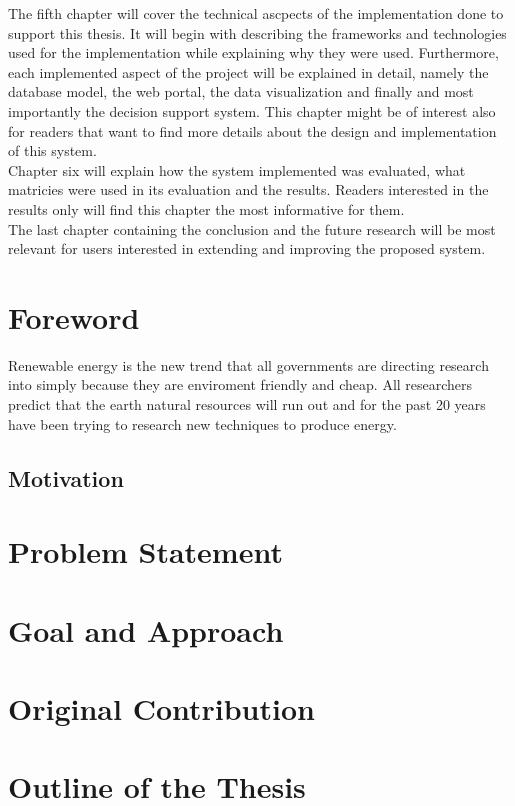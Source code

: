 \indent The fifth chapter will cover the technical ascpects of the implementation done to support this thesis. It will begin with describing the frameworks and technologies used for the implementation while explaining why they were used. Furthermore, each implemented aspect of the project will be explained in detail, namely the database model, the web portal, the data visualization and finally and most importantly the decision support system. This chapter might be of interest also for readers that want to find more details about the design and implementation of this system.\\
\indent Chapter six will explain how the system implemented was evaluated, what matricies were used in its evaluation and the results. Readers interested in the results only will find this chapter the most informative for them.\\
\indent The last chapter containing the conclusion and the future research will be most relevant for users interested in extending and improving the proposed system.\\
\section{Foreword}
\label{sec:Foreword}
\indent Renewable energy is the new trend that all governments are directing research into simply because they are enviroment friendly and cheap. All researchers predict that the earth natural resources will run out and for the past 20 years have been trying to research new techniques to produce energy.\cite{Ajila2011synchronization} \\
\subsection{Motivation}          
\label{subsec:Motivation}
\section{Problem Statement}
\label{sec:Problem Statement}
\section{Goal and Approach}
\label{sec:GoalAndApproach}
\section{Original Contribution}
\label{sec:OriginalContribution}
\section{Outline of the Thesis}
\label{sec:OutlineOfTheThesis}